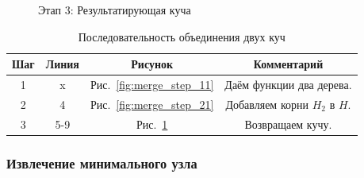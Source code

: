 \documentclass[a4paper,10pt]{article}
\begin{document}
        \begin{figure}[h!]
            \caption{Этап 3: Результатирующая куча}
            \label{fig:merge_step_31}
            \center
        \end{figure}

        \begin{table}[h!]
            \caption{Последовательность объединения двух куч}
			\center
            \begin{tabular}{|c|c|c|c|}
                \hline
                Шаг  & Линия &  Рисунок                      & Комментарий                \\ \hline
                  1  &   x   &  Рис.~\ref{fig:merge_step_11} & Даём функции два дерева.    \\ \hline
                  2  &   4   &  Рис.~\ref{fig:merge_step_21} & Добавляем корни $H_2$ в $H$. \\ \hline
                  3  &  5-9  &  Рис.~\ref{fig:merge_step_31} & Возвращаем кучу. \\ \hline
            \end{tabular}
        \end{table}

        \subsubsection*{Извлечение минимального узла}
\end{document}
